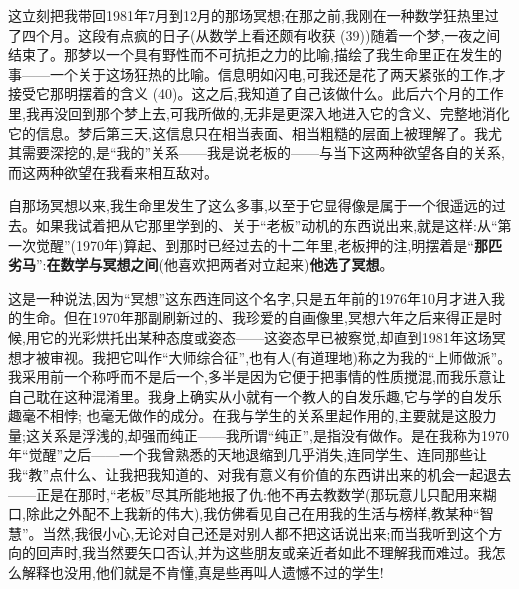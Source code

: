 这立刻把我带回1981年7月到12月的那场冥想;在那之前,我刚在一种数学狂热里过了四个月。这段有点疯的日子(从数学上看还颇有收获 (39))随着一个梦,一夜之间结束了。那梦以一个具有野性而不可抗拒之力的比喻,描绘了我生命里正在发生的事——一个关于这场狂热的比喻。信息明如闪电,可我还是花了两天紧张的工作,才接受它那明摆着的含义 (40)。这之后,我知道了自己该做什么。此后六个月的工作里,我再没回到那个梦上去,可我所做的,无非是更深入地进入它的含义、完整地消化它的信息。梦后第三天,这信息只在相当表面、相当粗糙的层面上被理解了。我尤其需要深挖的,是“我的”关系——我是说老板的——与当下这两种欲望各自的关系,而这两种欲望在我看来相互敌对。

 自那场冥想以来,我生命里发生了这么多事,以至于它显得像是属于一个很遥远的过去。如果我试着把从它那里学到的、关于“老板”动机的东西说出来,就是这样:从“第一次觉醒”(1970年)算起、到那时已经过去的十二年里,老板押的注,明摆着是“\textbf{那匹劣马}”:\textbf{在数学与冥想之间}(他喜欢把两者对立起来)\textbf{他选了冥想}。

 这是一种说法,因为“冥想”这东西连同这个名字,只是五年前的1976年10月才进入我的生命。但在1970年那副刷新过的、我珍爱的自画像里,冥想六年之后来得正是时候,用它的光彩烘托出某种态度或姿态——这姿态早已被察觉,却直到1981年这场冥想才被审视。我把它叫作“大师综合征”,也有人(有道理地)称之为我的“上师做派”。我采用前一个称呼而不是后一个,多半是因为它便于把事情的性质搅混,而我乐意让自己耽在这种混淆里。我身上确实从小就有一个教人的自发乐趣,它与学的自发乐趣毫不相悖;
也毫无做作的成分。在我与学生的关系里起作用的,主要就是这股力量;这关系是浮浅的,却强而纯正——我所谓“纯正”,是指没有做作。是在我称为1970年“觉醒”之后——一个我曾熟悉的天地退缩到几乎消失,连同学生、连同那些让我“教”点什么、让我把我知道的、对我有意义有价值的东西讲出来的机会一起退去——正是在那时,“老板”尽其所能地报了仇:他不再去教数学(那玩意儿只配用来糊口,除此之外配不上我新的伟大),我仿佛看见自己在用我的生活与榜样,教某种“智慧”。当然,我很小心,无论对自己还是对别人都不把这话说出来;而当我听到这个方向的回声时,我当然要矢口否认,并为这些朋友或亲近者如此不理解我而难过。我怎么解释也没用,他们就是不肯懂,真是些再叫人遗憾不过的学生!

